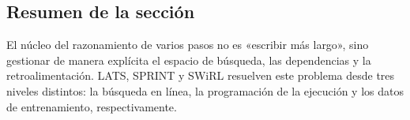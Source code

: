 \subsection{Resumen de la sección}

El núcleo del razonamiento de varios pasos no es «escribir más largo», sino gestionar de manera explícita el espacio de búsqueda, las dependencias y la retroalimentación. LATS, SPRINT y SWiRL resuelven este problema desde tres niveles distintos: la búsqueda en línea, la programación de la ejecución y los datos de entrenamiento, respectivamente.
